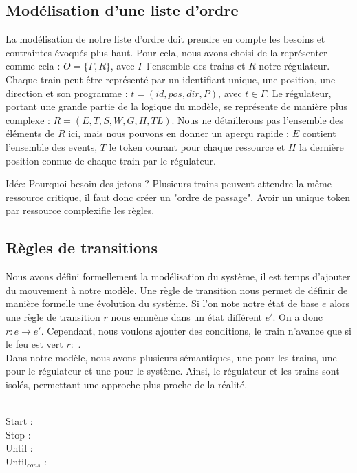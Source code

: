 \documentclass[runningheads]{llncs}
\begin{document}
\subsection{Modélisation d'une liste d'ordre}
La modélisation de notre liste d'ordre doit prendre en compte les besoins et contraintes évoqués plus haut.
Pour cela, nous avons choisi de la représenter comme cela : $O = \{\Gamma, R\}$, avec $\Gamma$ l'ensemble des trains et $R$ notre régulateur.
Chaque train peut être représenté par un identifiant unique, une position, une direction et son programme : $t = (id, pos, dir, P)$, avec $t \in \Gamma$.
Le régulateur, portant une grande partie de la logique du modèle, se représente de manière plus complexe : $R = (E,T,S,W,G,H,TL)$.
Nous ne détaillerons pas l'ensemble des éléments de $R$ ici, mais nous pouvons en donner un aperçu rapide : $E$ contient l'ensemble des events,
$T$ le token courant pour chaque ressource et $H$ la dernière position connue de chaque train par le régulateur.

Idée: Pourquoi besoin des jetons ? Plusieurs trains peuvent attendre la même ressource critique, il faut donc créer un "ordre de passage".
Avoir un unique token par ressource complexifie les règles.


\subsection{Règles de transitions}
Nous avons défini formellement la modélisation du système, il est temps d'ajouter du mouvement à notre modèle.
Une règle de transition nous permet de définir de manière formelle une évolution du système. 
Si l'on note notre état de base $e$ alors une règle de transition $r$ nous emmène dans un état différent $e'$. On a donc $r: e \rightarrow e'$.
Cependant, nous voulons ajouter des conditions, le train n'avance que si le feu est vert $r:$ .
\\Dans notre modèle, nous avons plusieurs sémantiques, une pour les trains, une pour le régulateur et une pour le système.
Ainsi, le régulateur et les trains sont isolés, permettant une approche plus proche de la réalité.

\noindent
\\Start : 
\\Stop : 
\\Until : 
\\Until$_{cons}$ : 
\end{document}
